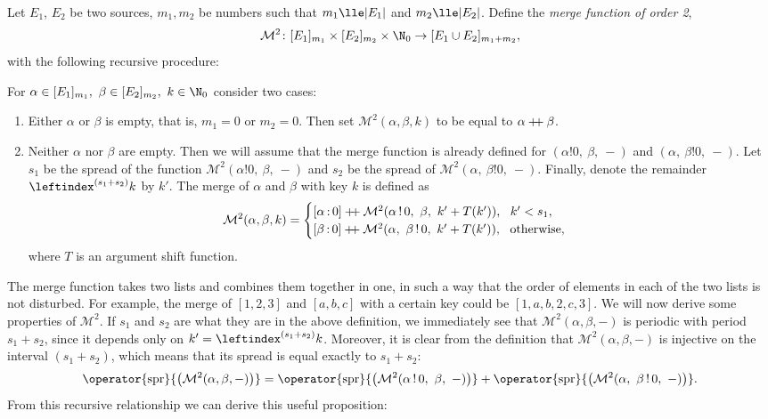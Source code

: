 \documentclass[12pt, a4paper]{article}
\newcommand{\M}{\mathcal{M}}
\newcommand{\dop}{\mathbin{{+}\hspace{-1mm}{+}}}
\newcommand{\spr}[1]{\operator{\mathrm{spr}}{\left(#1\right)}}
\newcommand{\lui}[1]{\leftindex^{#1}}
\newcommand{\elt}{\mathop{:}}
\newcommand{\wo}{\mathop{!}}
\begin{document}
\begin{definition}
    Let $ E_1 $, $ E_2 $ be two sources, $ m_1, m_2 $ be numbers such that $ m_1 \lle |E_1| $ and $ m_2 \lle |E_2| $. Define the \emph{merge function of order 2},
    \[ \M^2 \colon [E_1]_{m_1} \times [E_2]_{m_2} \times \N_0 \to [E_1 \cup E_2]_{m_1 + m_2}, \]
    with the following recursive procedure:

    For $ \alpha \in [E_1]_{m_1},\ \beta \in [E_2]_{m_2},\ k \in \N_0 $ consider two cases:
    \begin{enumerate}
        \item Either $ \alpha $ or $ \beta $ is empty, that is, $ m_1 = 0 $ or $ m_2 = 0 $.
            Then set $ \M^2(\alpha, \beta, k) $ to be equal to $ \alpha \dop \beta $.
        \item Neither $ \alpha $ nor $ \beta $ are empty.
            Then we will assume that the merge function is already defined for $ (\alpha \wo 0,\ \beta,\ -) $ and $ (\alpha,\ \beta \wo 0,\ -) $. Let $ s_1 $ be the spread of the function $ \M^2(\alpha \wo 0,\ \beta,\ -) $ and $ s_2 $ be the spread of $ \M^2(\alpha,\ \beta \wo 0,\ -) $. Finally, denote the remainder $ \lui{(s_1 + s_2)}k $ by $ k' $. The merge of $ \alpha $ and $ \beta $ with key $ k $ is defined as
            \[ \M^2(\alpha, \beta, k) = \begin{cases}
                [\alpha \elt 0] \dop \M^2(\alpha \wo 0,\ \beta,\ k' + T(k')), \ \ k' < s_1,\\
                [\beta \elt 0] \dop \M^2(\alpha,\ \beta \wo 0,\ k' + T(k')), \ \ \text{otherwise},\\
            \end{cases} \]
            where $ T $ is an argument shift function.
    \end{enumerate}
\end{definition}

The merge function takes two lists and combines them together in one, in such a way that the order of elements in each of the two lists is not disturbed. For example, the merge of $ [1,2,3] $ and $ [a,b,c] $ with a certain key could be $ [1,a,b,2,c,3] $. We will now derive some properties of $ \M^2 $. If $ s_1 $ and $ s_2 $ are what they are in the above definition, we immediately see that $ \M^2(\alpha, \beta, -) $ is periodic with period $ s_1 + s_2 $, since it depends only on $ k' = \lui{(s_1 + s_2)}k $. Moreover, it is clear from the definition that $ \M^2(\alpha, \beta, -) $ is injective on the interval $ (s_1 + s_2) $, which means that its spread is equal exactly to $ s_1 + s_2 $:
\begin{equation}\label{recspr}
    \spr{\M^2(\alpha, \beta, -)} = \spr{\M^2(\alpha \wo 0,\ \beta,\ -)} + \spr{\M^2(\alpha,\ \beta \wo 0,\ -)}.
\end{equation}
From this recursive relationship we can derive this useful proposition:
\end{document}
